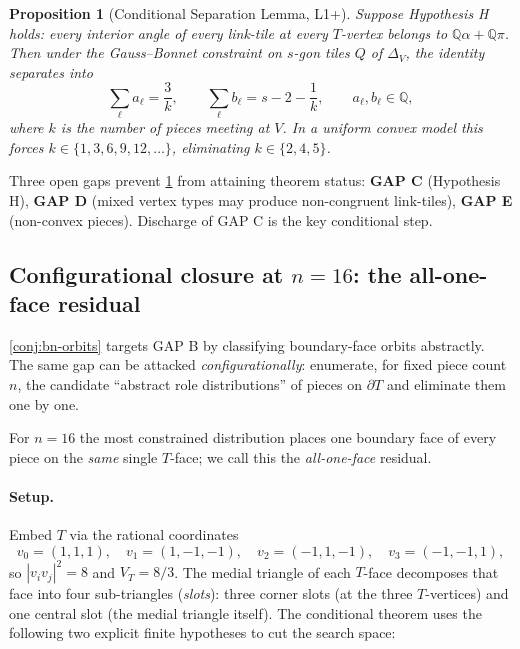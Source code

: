 \documentclass[11pt,a4paper]{article}
\theoremstyle{plain}
\newtheorem{proposition}[proposition]{Proposition}
\theoremstyle{definition}
\theoremstyle{remark}
\newcommand{\Q}{\mathbb{Q}}
\begin{document}
\begin{proposition}[Conditional Separation Lemma, L1+]\label{prop:csl}
Suppose \emph{Hypothesis H} holds: every interior angle of every link-tile
at every $T$-vertex belongs to $\Q\alpha + \Q\pi$.
Then under the Gauss--Bonnet constraint on $s$-gon tiles $Q$ of
$\Delta_{V}$, the identity separates into
\[
  \sum_{\ell} a_{\ell} = \frac{3}{k},
  \qquad
  \sum_{\ell} b_{\ell} = s - 2 - \frac{1}{k},
  \qquad a_{\ell}, b_{\ell} \in \Q,
\]
where $k$ is the number of pieces meeting at $V$.  In a uniform convex model
this forces $k \in \{1, 3, 6, 9, 12, \ldots\}$, eliminating $k \in \{2, 4, 5\}$.
\end{proposition}

Three open gaps prevent \cref{prop:csl} from attaining theorem status:
\textbf{GAP C} (Hypothesis H), \textbf{GAP D} (mixed vertex types may
produce non-congruent link-tiles), \textbf{GAP E} (non-convex pieces).
Discharge of GAP C is the key conditional step.

\subsection{Configurational closure at \texorpdfstring{$n = 16$}{n=16}:
the all-one-face residual}\label{sec:prog-n16}

\cref{conj:bn-orbits} targets GAP B by classifying boundary-face orbits
abstractly.  The same gap can be attacked \emph{configurationally}:
enumerate, for fixed piece count $n$, the candidate ``abstract role
distributions'' of pieces on $\partial T$ and eliminate them one by one.

For $n = 16$ the most constrained distribution places one boundary face of
every piece on the \emph{same} single $T$-face; we call this the
\emph{all-one-face} residual.

\paragraph{Setup.}
Embed $T$ via the rational coordinates
\begin{equation}\label{eq:16-embedding}
  v_{0} = (1,1,1),\quad
  v_{1} = (1,-1,-1),\quad
  v_{2} = (-1,1,-1),\quad
  v_{3} = (-1,-1,1),
\end{equation}
so $|v_{i} v_{j}|^{2} = 8$ and $V_{T} = 8/3$.  The medial triangle of each
$T$-face decomposes that face into four sub-triangles (\emph{slots}): three
corner slots (at the three $T$-vertices) and one central slot (the medial
triangle itself).  The conditional theorem uses the following two explicit
finite hypotheses to cut the search space:
\end{document}
